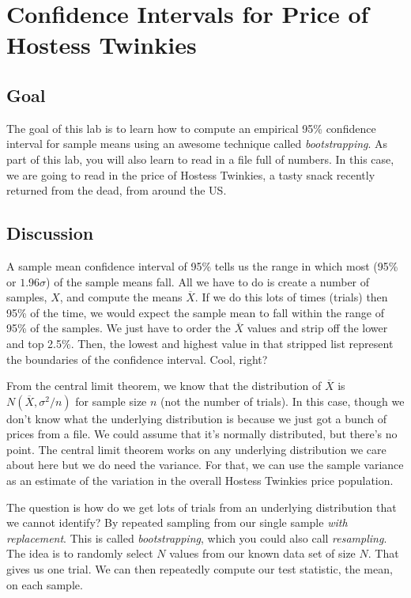 \chapter{Confidence Intervals for Price of Hostess Twinkies}

\setcounter{problem}{1}
\section{Goal}

\begin{fullwidth}


The goal of this lab is to learn how to compute an empirical 95\% confidence interval for sample means using an awesome technique called {\em bootstrapping}. As part of this lab, you will also learn to read in a file full of numbers. In this case, we are going to read in the price of Hostess Twinkies, a tasty snack recently returned from the dead, from around the US.

\section{Discussion}

A sample mean confidence interval of 95\% tells us the range in which most (95\% or $1.96\sigma$) of the sample means fall.  All we have to do is create a number of samples, $X$, and compute the means $\overline{X}$.  If we do this lots of times (trials) then 95\% of the time, we would expect the sample mean to fall within the range of 95\% of the samples. We just have to order the $\overline{X}$ values and strip off the lower and top 2.5\%. Then, the lowest and highest value in that stripped list represent the boundaries of the confidence interval. Cool, right?

From the central limit theorem, we know that the distribution of $\overline{X}$ is $N(\overline{X}, \sigma^2/n)$ for sample size $n$ (not the number of trials). In this case, though we don't know what the underlying distribution is because we just got a bunch of prices from a file. We could assume that it's normally distributed, but there's no point. The central limit theorem works on any underlying distribution we care about here but we do need the variance. For that, we can use the sample variance as an estimate of the variation in the overall Hostess Twinkies price population.

The question is how do we get lots of trials from an underlying distribution that we cannot identify? By repeated sampling from our single sample {\em with replacement}. This is called {\em bootstrapping}, which you could also call {\em resampling}. The idea is to randomly select $N$ values from our known data set of size $N$. That gives us one trial. We can then repeatedly compute our test statistic, the mean, on each sample.


\end{fullwidth}

